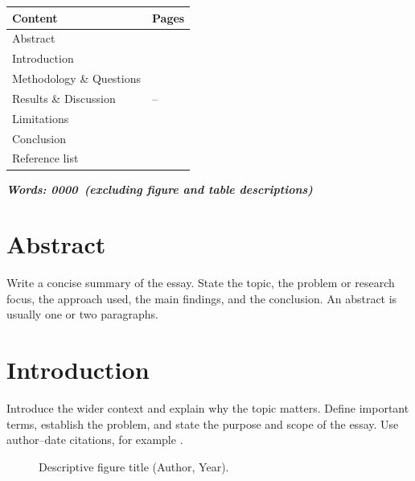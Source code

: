 \documentclass[12pt,letterpaper]{article}
\newcommand{\wordcount}{0000}
\begin{document}
\begin{center}
\begin{tabular}{>{\raggedright\arraybackslash}p{}
                >{\centering\arraybackslash}p{}}
\toprule
\textbf{Content} & \textbf{Pages} \\
\midrule
Abstract & \pageref{sec:abstract} \\
Introduction & \pageref{sec:introduction} \\
Methodology \& Questions & \pageref{sec:methodology} \\
Results \& Discussion & \pageref{sec:results}--\pageref{sec:limitations} \\
Limitations & \pageref{sec:limitations} \\
Conclusion & \pageref{sec:conclusion} \\
Reference list & \pageref{sec:references} \\
\bottomrule
\end{tabular}
\end{center}

\textit{\textbf{Words: \wordcount\ (excluding figure and table descriptions)}}

\section{Abstract}
\label{sec:abstract}
Write a concise summary of the essay. State the topic, the problem or
research focus, the approach used, the main findings, and the conclusion.
An abstract is usually one or two paragraphs.

\section{Introduction}
\label{sec:introduction}
Introduce the wider context and explain why the topic matters. Define
important terms, establish the problem, and state the purpose and scope of
the essay. Use author--date citations, for example \parencite{example2024}.

\begin{figure}[htbp]
  \centering
  \caption{Descriptive figure title (Author, Year).}
  \label{fig:introduction-example}
\end{figure}
\end{document}
